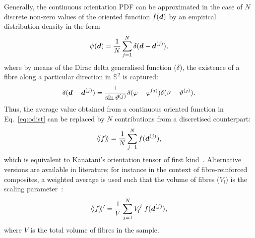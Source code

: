	
	Generally, the continuous orientation PDF can be approximated in the case of $N$ discrete non-zero values of the oriented function $f(\tena{d})$ by an empirical distribution density in the form~\autocite{Kanatani.1984}
	\begin{equation}
		\psi(\tena{d})=\frac{1}{N}\sum_{j=1}^N\delta(\tena{d}-\tena{d}^{(j)}),
	\end{equation}
	where by means of the Dirac delta generalised function ($\delta$), the existence of a fibre along a particular direction in $\mathbb{S}^2$ is captured:
	\begin{equation}
		\delta(\tena{d}-\tena{d}^{(j)})= \frac{1}{\sin\vartheta^{(j)}} \delta(\varphi-\varphi^{(j)})\delta(\vartheta-\vartheta^{(j)}).
	\end{equation}
	Thus, the average value obtained from a continuous oriented function in Eq.~\eqref{eq:odist} can be replaced by $N$ contributions from a discretised counterpart:
	\begin{equation}
		\averot{f} =\frac{1}{N}\sum_{j=1}^N f(\tena{d}^{(j)}),
	\end{equation}
	which is equivalent to Kanatani's orientation tensor of first kind~\autocite{Kanatani.1984}. Alternative versions are available in literature; for instance in the context of fibre-reinforced composites, a weighted average is used such that the volume of fibres ($V_\text{f}$) is the scaling parameter~\autocite{Muller.2016}:
	\begin{equation}\label{eq:OTw}
		\averot{f}^\prime =\frac{1}{V}\sum_{j=1}^{N} V^j_\text{f}\; f(\tena{d}^{(j)}),
	\end{equation}
	where $V$ is the total volume of fibres in the sample.
